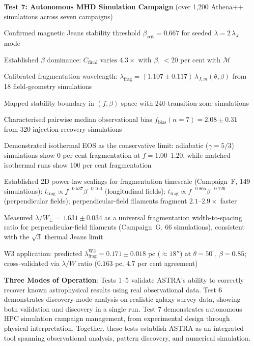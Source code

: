 \documentclass[usenatbib]{rasti}
\begin{document}
\textbf{Test 7: Autonomous MHD Simulation Campaign} (over 1,200 Athena++ simulations across seven campaigns)
\begin{description}
\item Confirmed magnetic Jeans stability threshold $\beta_\mathrm{crit} = 0.667$ for seeded $\lambda = 2\,\lambda_J$ mode
\item Established $\beta$ dominance: $C_\mathrm{final}$ varies $4.3\times$ with $\beta$, $<$20 per cent with $\mathcal{M}$
\item Calibrated fragmentation wavelength: $\lambda_\mathrm{frag} = (1.107 \pm 0.117)\,\lambda_{J,m}(\theta,\beta)$ from 18 field-geometry simulations
\item Mapped stability boundary in $(f, \beta)$ space with 240 transition-zone simulations
\item Characterised pairwise median observational bias $f_\mathrm{bias}(n=7) = 2.08 \pm 0.31$ from 320 injection-recovery simulations
\item Demonstrated isothermal EOS as the conservative limit: adiabatic ($\gamma=5/3$) simulations show 0 per cent fragmentation at $f=1.00$--$1.20$, while matched isothermal runs show 100 per cent fragmentation
\item Established 2D power-law scalings for fragmentation timescale (Campaign~F, 149 simulations): $t_\mathrm{frag} \propto f^{-0.537}\beta^{-0.160}$ (longitudinal fields); $t_\mathrm{frag} \propto f^{-0.865}\beta^{-0.126}$ (perpendicular fields); perpendicular-field filaments fragment $2.1$--$2.9\times$ faster
\item Measured $\lambda/W_\perp = 1.631 \pm 0.034$ as a universal fragmentation width-to-spacing ratio for perpendicular-field filaments (Campaign~G, 66 simulations), consistent with the $\sqrt{3}$ thermal Jeans limit
\item W3 application: predicted $\lambda_\mathrm{frag}^{\mathrm{W3}} = 0.171 \pm 0.018$ pc ($\approx 18''$) at $\theta=50^\circ$, $\beta=0.85$; cross-validated via $\lambda/W$ ratio ($0.163$ pc, 4.7 per cent agreement)
\end{description}

\textbf{Three Modes of Operation}: Tests 1--5 validate ASTRA's ability to correctly recover known astrophysical results using real observational data. Test 6 demonstrates discovery-mode analysis on realistic galaxy survey data, showing both validation and discovery in a single run. Test 7 demonstrates autonomous HPC simulation campaign management, from experimental design through physical interpretation. Together, these tests establish ASTRA as an integrated tool spanning observational analysis, pattern discovery, and numerical simulation.
\end{document}
